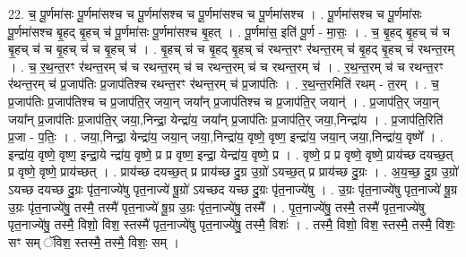 \documentclass[17pt]{extarticle}
\begin{document}
22. च॒ पू॒र्णमा॑सः पू॒र्णमा॑सश्च च पू॒र्णमा॑सश्च च पू॒र्णमा॑सश्च च पू॒र्णमा॑सश्च । . पू॒र्णमा॑सश्च च पू॒र्णमा॑सः पू॒र्णमा॑सश्च बृ॒हद् बृ॒हच् च॑ पू॒र्णमा॑सः पू॒र्णमा॑सश्च बृ॒हत् । . पू॒र्णमा॑स॒ इति॑ पू॒र्ण - मा॒सः॒ । . च॒ बृ॒हद् बृ॒हच् च॑ च बृ॒हच् च॑ च बृ॒हच् च॑ च बृ॒हच् च॑ । . बृ॒हच् च॑ च बृ॒हद् बृ॒हच् च॑ रथन्त॒रꣳ र॑थन्त॒रम् च॑ बृ॒हद् बृ॒हच् च॑ रथन्त॒रम् । . च॒ र॒थ॒न्त॒रꣳ र॑थन्त॒रम् च॑ च रथन्त॒रम् च॑ च रथन्त॒रम् च॑ च रथन्त॒रम् च॑ । . र॒थ॒न्त॒रम् च॑ च रथन्त॒रꣳ र॑थन्त॒रम् च॑ प्र॒जाप॑तिः प्र॒जाप॑तिश्च रथन्त॒रꣳ र॑थन्त॒रम् च॑ प्र॒जाप॑तिः । . र॒थ॒न्त॒रमिति॑ रथम् - त॒रम् । . च॒ प्र॒जाप॑तिः प्र॒जाप॑तिश्च च प्र॒जाप॑ति॒र् जया॒न् जया᳚न् प्र॒जाप॑तिश्च च प्र॒जाप॑ति॒र् जयान्॑ । . प्र॒जाप॑ति॒र् जया॒न् जया᳚न् प्र॒जाप॑तिः प्र॒जाप॑ति॒र् जया॒,निन्द्रा॒ येन्द्रा॑य॒ जया᳚न् प्र॒जाप॑तिः प्र॒जाप॑ति॒र् जया॒,निन्द्रा॑य । . प्र॒जाप॑ति॒रिति॑ प्र॒जा - प॒तिः॒ । . जया॒,निन्द्रा॒ येन्द्रा॑य॒ जया॒न् जया॒,निन्द्रा॑य॒ वृष्णे॒ वृष्ण॒ इन्द्रा॑य॒ जया॒न् जया॒,निन्द्रा॑य॒ वृष्णे᳚ । . इन्द्रा॑य॒ वृष्णे॒ वृष्ण॒ इन्द्रा॒ये न्द्रा॑य॒ वृष्णे॒ प्र प्र वृष्ण॒ इन्द्रा॒ येन्द्रा॑य॒ वृष्णे॒ प्र । . वृष्णे॒ प्र प्र वृष्णे॒ वृष्णे॒ प्राय॑च्छ दयच्छ॒त् प्र वृष्णे॒ वृष्णे॒ प्राय॑च्छत् । . प्राय॑च्छ दयच्छ॒त् प्र प्राय॑च्छ दु॒ग्र उ॒ग्रो॑ ऽयच्छ॒त् प्र प्राय॑च्छ दु॒ग्रः । . अ॒य॒च्छ॒ दु॒ग्र उ॒ग्रो॑ ऽयच्छ दयच्छ दु॒ग्रः पृ॑त॒नाज्ये॑षु पृत॒नाज्ये॑ षू॒ग्रो॑ ऽयच्छद यच्छ दु॒ग्रः पृ॑त॒नाज्ये॑षु । . उ॒ग्रः पृ॑त॒नाज्ये॑षु पृत॒नाज्ये॑ षू॒ग्र उ॒ग्रः पृ॑त॒नाज्ये॑षु॒ तस्मै॒ तस्मै॑ पृत॒नाज्ये॑ षू॒ग्र उ॒ग्रः पृ॑त॒नाज्ये॑षु॒ तस्मै᳚ । . पृ॒त॒नाज्ये॑षु॒ तस्मै॒ तस्मै॑ पृत॒नाज्ये॑षु पृत॒नाज्ये॑षु॒ तस्मै॒ विशो॒ विश॒ स्तस्मै॑ पृत॒नाज्ये॑षु पृत॒नाज्ये॑षु॒ तस्मै॒ विशः॑ । . तस्मै॒ विशो॒ विश॒ स्तस्मै॒ तस्मै॒ विशः॒ सꣳ सम् ॅविश॒ स्तस्मै॒ तस्मै॒ विशः॒ सम् । \newline
\end{document}
